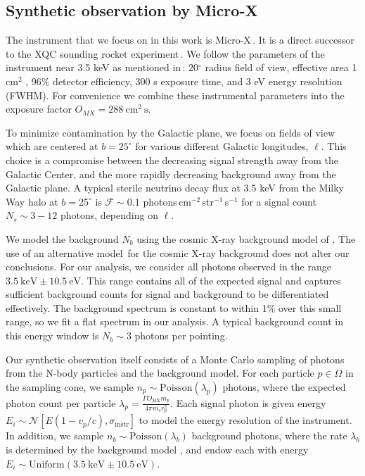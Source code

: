 \documentclass[aps,prd,10pt,twocolumn,superscriptaddress,showpacs]{revtex4-1}
\newcommand{\units}[1]{~\mathrm{#1}}
\begin{document}
\subsection{Synthetic observation by Micro-X}
\label{sec:microx}

The instrument that we focus on in this work is Micro-X\,\cite{Figueroa-Feliciano:2015gwa}.  It is a
direct successor to the XQC sounding rocket
experiment\,\cite{McCammon:2002gb,Boyarsky:2006hr,Crowder:2012ts}.  We follow the parameters of the
instrument near 3.5 keV as mentioned in\,\cite{Figueroa-Feliciano:2015gwa}: 20$^\circ$ radius field
of view, effective area 1 cm$^2$ , 96\% detector efficiency, 300 s exposure time, and 3 eV
energy resolution (FWHM). For convenience we combine these instrumental parameters into the exposure factor
$O_{MX}=288\units{cm^2~s}$.

To minimize contamination by the Galactic plane, we focus on fields of view which are centered at $b = 25^\circ$ for various different Galactic longitudes, $\ell$.  This choice is a compromise between the decreasing signal strength away from the Galactic Center, and the more rapidly decreasing background away from the Galactic plane.  A typical sterile neutrino decay flux at $3.5$ keV from
the Milky Way halo at $b=25^\circ$ is $\mathcal{F}\sim 0.1$ photons\,cm$^{-2}$\,str$^{-1}$\,s$^{-1}$ 
for a signal count $N_s \sim 3-12$ photons, depending on $\ell$. 

We model the background $N_b$ using the cosmic X-ray background model of \cite{Ajello:2008xb}.  The
use of an alternative model\,\cite{Hickox:2005dz} for the cosmic X-ray background does not alter our
conclusions. For our analysis, we consider all photons observed in the range
$3.5\units{keV}\pm10.5\units{eV}$. This range contains all of the expected signal and captures
sufficient background counts for signal and background to be differentiated effectively. The
background spectrum is constant to within 1\% over this small range, so we fit a flat spectrum in
our analysis. A typical background count in this energy window is $N_b \sim 3$ photons per pointing.

Our synthetic observation itself consists of a Monte Carlo sampling of photons from the N-body particles
and the background model. For each particle $p \in \Omega$ in the sampling cone, we sample $n_p \sim
\mathrm{Poisson}(\lambda_p)$ photons, where the expected photon count per particle
$\lambda_p=\frac{\Gamma O_\mathrm{MX}m_p}{4\pi m_s r_p^2}$.
Each signal photon is given energy $E_i \sim \mathcal{N}[E(1-v_p/c),
\sigma_\mathrm{instr}]$ to model the energy resolution of the instrument. In
addition, we sample $n_b \sim \mathrm{Poisson}(\lambda_b)$ background photons, where the rate $\lambda_b$ is
determined by the background model \cite{Ajello:2008xb}, and endow each with energy
$E_i \sim \mathrm{Uniform}(3.5\units{keV}\pm10.5\units{eV})$. 
\end{document}
